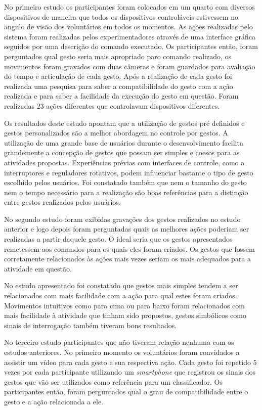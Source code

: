 No primeiro estudo os participantes foram colocados em um quarto com diversos dispositivos de maneira que todos os dispositivos controláveis estivessem no angulo de visão dos voluntários em todos os momentos. As ações realizadas pelo sistema foram realizadas pelos experimentadores através de uma interface gráfica seguidos por uma descrição do comando executado. Os participantes então, foram perguntados qual gesto seria mais apropriado paro comando realizado, os movimentos foram gravados com duas câmeras e foram guardados para avaliação do tempo e articulação de cada gesto.
% 
Após a realização de cada gesto foi realizada uma pesquisa para saber a compatibilidade do gesto com a ação realizada e para saber a facilidade da execução do gesto em questão. Foram realizadas $23$ ações diferentes que controlavam dispositivos diferentes.


Os resultados deste estudo apontam que a utilização de gestos pré definidos e gestos personalizados são a melhor abordagem no controle por gestos. A utilização de uma grande base de usuários durante o desenvolvimento facilita grandemente a concepção de gestos que possam ser simples e coesos para as atividades propostas. Experiências prévias com interfaces de controle, como a interruptores e reguladores rotativos, podem influenciar bastante o tipo de gesto escolhido pelos usuários. Foi constatado também que nem o tamanho do gesto nem o tempo necessário para a realização são boas referências para a distinção entre gestos realizados pelos usuários. 


No segundo estudo foram exibidas gravações dos gestos realizados no estudo anterior e logo depois foram perguntadas quais as melhores ações poderiam ser realizadas a partir daquele gesto. O ideal seria que os gestos apresentados remetessem aos comandos para os quais eles foram criados. Os gestos que fossem corretamente relacionados às ações mais vezes seriam os mais adequados para a atividade em questão. 

No estudo apresentado foi constatado que gestos mais simples tendem a ser relacionados com mais facilidade com a ação para qual estes foram criados. Movimentos intuitivos como para cima ou para baixo foram relacionados com mais facilidade à atividade que tinham sido propostos, gestos simbólicos como sinais de interrogação também tiveram bons resultados.

No terceiro estudo participantes que não tiveram relação nenhuma com os estudos anteriores. No primeiro momento os voluntários foram convidados a assistir um vídeo para cada gesto e sua respectiva ação. Cada gesto foi repetido $5$ vezes por cada participante utilizando um \textit{smartphone} que registrou os sinais dos gestos que vão ser utilizados como referência para um classificador. Os participantes então, foram perguntados qual o grau de compatibilidade entre o gesto e a ação relacionada a ele.

